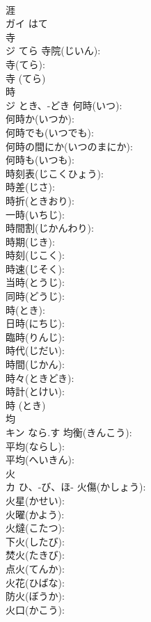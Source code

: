 \documentclass[8pt]{extreport}
\begin{document}
\begin{CJK}{UTF8}{min}
\\	涯		
\\	ガイ	はて		
\\	寺			
\\	ジ	てら	寺院(じいん): 
\\	寺(てら): 
\\	寺 (てら)
\\	時			
\\	ジ	とき、-どき	何時(いつ): 
\\	何時か(いつか): 
\\	何時でも(いつでも): 
\\	何時の間にか(いつのまにか): 
\\	何時も(いつも): 
\\	時刻表(じこくひょう): 
\\	時差(じさ): 
\\	時折(ときおり): 
\\	一時(いちじ): 
\\	時間割(じかんわり): 
\\	時期(じき): 
\\	時刻(じこく): 
\\	時速(じそく): 
\\	当時(とうじ): 
\\	同時(どうじ): 
\\	時(とき): 
\\	日時(にちじ): 
\\	臨時(りんじ): 
\\	時代(じだい): 
\\	時間(じかん): 
\\	時々(ときどき): 
\\	時計(とけい): 
\\	時 (とき)
\\	均			
\\	キン	なら.す	均衡(きんこう): 
\\	平均(ならし): 
\\	平均(へいきん): 
\\	火			
\\	カ	ひ、-び、ほ-	火傷(かしょう): 
\\	火星(かせい): 
\\	火曜(かよう): 
\\	火燵(こたつ): 
\\	下火(したび): 
\\	焚火(たきび): 
\\	点火(てんか): 
\\	火花(ひばな): 
\\	防火(ぼうか): 
\\	火口(かこう): 

\end{CJK}
\end{document}
